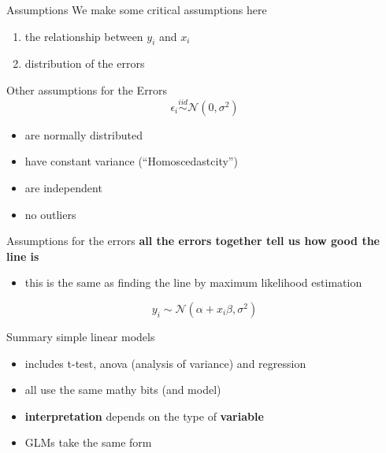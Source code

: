 \documentclass[
  ignorenonframetext,
]{beamer}
\providecommand{\tightlist}{%
  \setlength{\itemsep}{0pt}\setlength{\parskip}{0pt}}
\begin{document}
\begin{frame}{Assumptions}
\protect\hypertarget{assumptions}{}
We make some critical assumptions here

\begin{enumerate}
[1)]
\tightlist
\item
  the relationship between \(y_i\) and \(x_i\)
\item
  distribution of the errors
\end{enumerate}
\end{frame}

\begin{frame}{Other assumptions for the Errors}
\protect\hypertarget{other-assumptions-for-the-errors}{}
\begin{equation}
\epsilon_i \overset{iid}{\sim} \mathcal{N}(0, \sigma^2)
\end{equation}

\begin{itemize}
\tightlist
\item
  are normally distributed
\item
  have constant variance (``Homoscedastcity'')
\item
  are independent
\item
  no outliers
\end{itemize}
\end{frame}

\begin{frame}{Assumptions for the errors}
\protect\hypertarget{assumptions-for-the-errors}{}
\textbf{all the errors together tell us how good the line is}

\begin{itemize}
\tightlist
\item
  this is the same as finding the line by maximum likelihood estimation
\end{itemize}

\begin{equation}
y_i \sim \mathcal{N}(\alpha+x_i\beta, \sigma^2)
\end{equation}
\end{frame}

\begin{frame}{Summary simple linear models}
\protect\hypertarget{summary-simple-linear-models}{}
\begin{itemize}
\tightlist
\item
  includes t-test, anova (analysis of variance) and regression
\item
  all use the same mathy bits (and model)
\item
  \textbf{interpretation} depends on the type of \textbf{variable}
\item
  GLMs take the same form
\end{itemize}
\end{frame}
\end{document}
